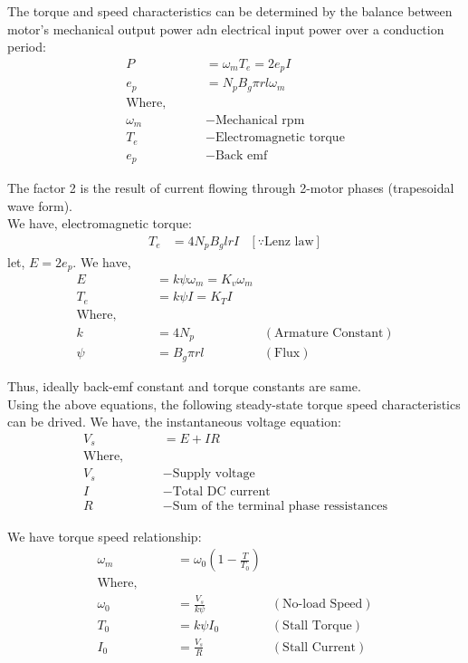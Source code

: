 
The torque and speed characteristics can be determined by the balance between motor's mechanical output power adn electrical input power over a conduction period:
\begin{align*}
    P &= \omega_m T_e = 2 e_p I\\
    e_p &= N_p B_g \pi r l \omega_m\\
    \text{Where, } \qquad &\\
    \omega_m &- \text{Mechanical rpm}\\
    T_e      &- \text{Electromagnetic torque}\\
    e_p      &- \text{Back emf}
\end{align*}

The factor 2 is the result of current flowing through 2-motor phases (trapesoidal wave form).\\

We have, electromagnetic torque:
\begin{align*}
    T_e &= 4 N_p B_g l r I &[\because \text{Lenz law}]
\end{align*}
let, $E = 2 e_p$. We have,
\begin{align*}
    E &= k \psi \omega_m = K_v \omega_m\\
    T_e &= k \psi I = K_T I\\
\text{Where, } \qquad &\\
    k &= 4 N_p  &(\text{Armature Constant})\\
    \psi &= B_g \pi  r l  &(\text{Flux})
\end{align*}

Thus, ideally back-emf constant and torque constants are same.\\

Using the above equations, the following steady-state torque speed characteristics can be drived. We have, the instantaneous voltage equation:
\begin{align*}
    V_s &= E + I R\\
\text{Where, } \qquad &\\
    V_s &- \text{Supply voltage}\\
    I &- \text{Total DC current}\\
    R &- \text{Sum of the terminal phase ressistances}
\end{align*}

We have torque speed relationship:
\begin{align*}
    \omega_m &= \omega_0 \left( 1 - \frac{T}{T_0} \right)\\
\text{Where, } \qquad &\\
    \omega_0 &= \frac{V_s}{k \psi} & (\text{No-load Speed})\\
    T_0 &= k \psi I_0              & (\text{Stall Torque})\\
    I_0 &= \frac{V_s}{R}           & (\text{Stall Current})
\end{align*}
